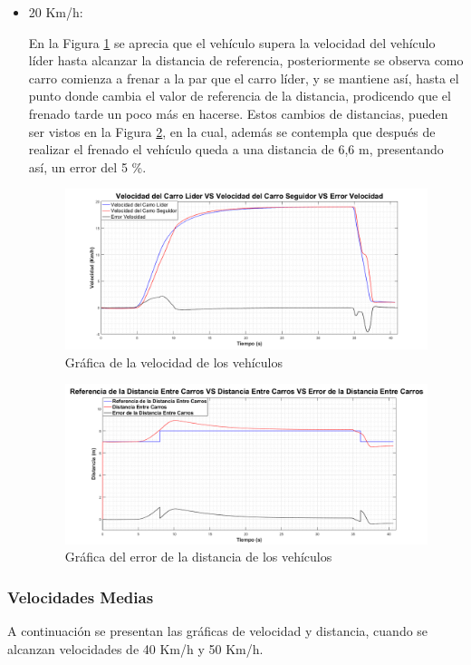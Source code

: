 \begin{itemize}
\item 20 Km/h:

En la Figura \ref{fig:velstg20} se aprecia que el vehículo supera la velocidad del vehículo líder hasta alcanzar la distancia de referencia, posteriormente se observa como carro comienza a frenar a la par que el carro líder, y se mantiene así, hasta el punto donde cambia el valor de referencia de la distancia, prodicendo que el frenado tarde un poco más en hacerse. Estos cambios de distancias, pueden ser vistos en la Figura \ref{fig:diststg20}, en la cual, además se contempla que después de realizar el frenado el vehículo queda a una distancia de 6,6 m, presentando así, un error del 5 \%.

\begin{figure}[H]
	\centering
		\includegraphics[scale=0.35]{Imagenes/stg20}
		\caption{Gráfica de la velocidad de los vehículos}
		\label{fig:velstg20}
\end{figure}	

\begin{figure}[H]
	\centering
		\includegraphics[scale=0.35]{Imagenes/stg20dist}
		\caption{Gráfica del error de la distancia de los vehículos}
		\label{fig:diststg20}
\end{figure}	

\end{itemize}
\subsubsection{Velocidades Medias}
A continuación se presentan las gráficas de velocidad y distancia, cuando se alcanzan velocidades de 40 Km/h y 50 Km/h. 

